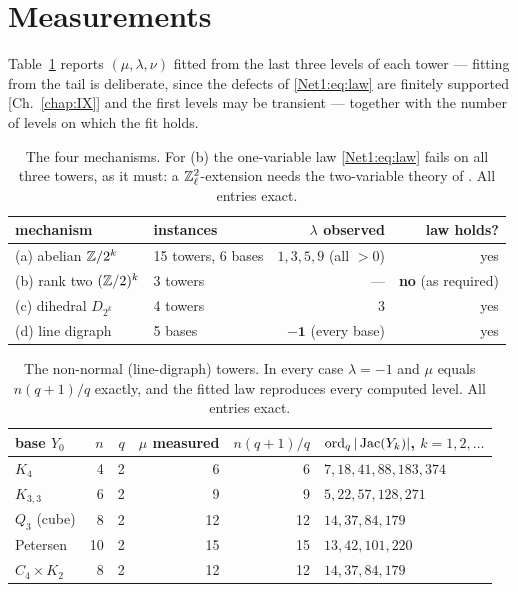 \section{Measurements}\label{Net1:sec:measure}

Table~\ref{Net1:tab:main} reports $(\mu,\lambda,\nu)$ fitted from the last three levels of each
tower --- fitting from the tail is deliberate, since the defects of \eqref{Net1:eq:law} are
finitely supported [Ch.~\ref{chap:IX}] and the first levels may be transient --- together with
the number of levels on which the fit holds.

\begin{table}[ht]
\centering\small
\begin{tabular}{llrr}
\toprule
mechanism & instances & $\lambda$ observed & law holds?\\
\midrule
(a) abelian $\mathbb{Z}/2^{k}$ & 15 towers, 6 bases & $1,3,5,9$ (all $>0$) & yes\\
(b) rank two $(\mathbb{Z}/2)^{k}$ & 3 towers & --- & \textbf{no} (as required)\\
(c) dihedral $D_{2^{k}}$ & 4 towers & $3$ & yes\\
(d) line digraph & 5 bases & $\mathbf{-1}$ (every base) & yes\\
\bottomrule
\end{tabular}
\caption{The four mechanisms. For (b) the one-variable law \eqref{Net1:eq:law} fails on all
three towers, as it must: a $\mathbb{Z}_\ell^{2}$-extension needs the two-variable theory of
\cite{CM81,DV22,KM24}. All entries exact.}
\label{Net1:tab:main}
\end{table}

\begin{table}[ht]
\centering\small
\begin{tabular}{lrrrrl}
\toprule
base $Y_0$ & $n$ & $q$ & $\mu$ measured & $n(q{+}1)/q$ & $\operatorname{ord}_q|\operatorname{Jac}(Y_k)|$, $k=1,2,\dots$\\
\midrule
$K_4$          &  4 & 2 &  6 &  6 & $7,18,41,88,183,374$\\
$K_{3,3}$      &  6 & 2 &  9 &  9 & $5,22,57,128,271$\\
$Q_3$ (cube)   &  8 & 2 & 12 & 12 & $14,37,84,179$\\
Petersen       & 10 & 2 & 15 & 15 & $13,42,101,220$\\
$C_4\times K_2$&  8 & 2 & 12 & 12 & $14,37,84,179$\\
\bottomrule
\end{tabular}
\caption{The non-normal (line-digraph) towers. In every case $\lambda=-1$ and $\mu$ equals
$n(q{+}1)/q$ exactly, and the fitted law reproduces every computed level. All entries
exact.}
\label{Net1:tab:ld}
\end{table}

